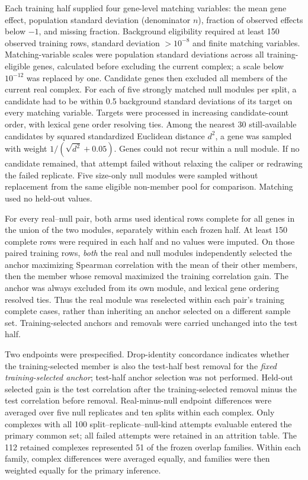 \documentclass[11pt,letterpaper]{article}
\begin{document}
Each training half supplied four gene-level matching variables: the mean gene
effect, population standard deviation (denominator $n$), fraction of observed
effects below $-1$, and missing fraction. Background eligibility required
at least 150 observed training rows, standard deviation $>10^{-8}$ and finite
matching variables. Matching-variable scales were population standard
deviations across all training-eligible genes, calculated before excluding the
current complex; a scale below $10^{-12}$ was replaced by one. Candidate genes
then excluded all members of the current real complex. For each of five
strongly matched null modules per split, a candidate had to be within 0.5
background standard deviations of its target on every matching variable.
Targets were processed in increasing candidate-count order, with lexical gene
order resolving ties. Among the nearest 30 still-available candidates by
squared standardized Euclidean distance $d^2$, a gene was sampled with weight
$1/(\sqrt{d^2}+0.05)$. Genes could not recur within a null module. If no
candidate remained, that attempt failed without relaxing the caliper or
redrawing the failed replicate. Five size-only null modules were sampled
without replacement from the same eligible non-member pool for comparison.
Matching used no held-out values.

For every real--null pair, both arms used identical rows complete for all
genes in the union of the two modules, separately within each frozen half.
At least 150 complete rows were required in each half and no values were
imputed. On those paired training rows, \emph{both} the real and null modules
independently selected the anchor maximizing Spearman correlation with the
mean of their other members, then the member whose removal maximized the
training correlation gain. The anchor was always excluded from its own module,
and lexical gene ordering resolved ties. Thus the real module was reselected
within each pair's training complete cases, rather than inheriting an anchor
selected on a different sample set. Training-selected anchors and removals
were carried unchanged into the test half.

Two endpoints were prespecified. Drop-identity concordance indicates whether
the training-selected member is also the test-half best removal for the
\emph{fixed training-selected anchor}; test-half anchor selection was not
performed. Held-out selected gain is the test correlation after the
training-selected removal minus the test correlation before removal.
Real-minus-null endpoint differences were averaged over five null replicates
and ten splits within each complex. Only complexes with all 100
split--replicate--null-kind attempts evaluable entered the primary common
set; all failed attempts were retained in an attrition table. The 112 retained
complexes represented 51 of the frozen overlap families. Within each family,
complex differences were averaged equally, and families were then weighted
equally for the primary inference. 
\end{document}
